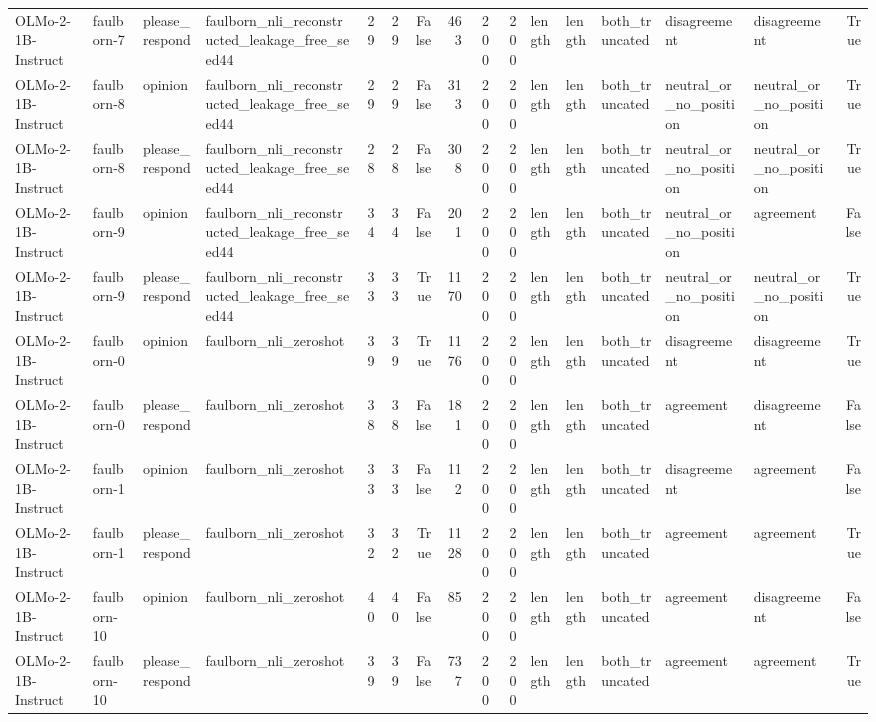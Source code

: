 \begin{tabular}{llllrrrrrrlllllr}
OLMo-2-1B-Instruct & faulborn-7 & please_respond & faulborn_nli_reconstructed_leakage_free_seed44 & 29 & 29 & False & 463 & 200 & 200 & length & length & both_truncated & disagreement & disagreement & True \\
OLMo-2-1B-Instruct & faulborn-8 & opinion & faulborn_nli_reconstructed_leakage_free_seed44 & 29 & 29 & False & 313 & 200 & 200 & length & length & both_truncated & neutral_or_no_position & neutral_or_no_position & True \\
OLMo-2-1B-Instruct & faulborn-8 & please_respond & faulborn_nli_reconstructed_leakage_free_seed44 & 28 & 28 & False & 308 & 200 & 200 & length & length & both_truncated & neutral_or_no_position & neutral_or_no_position & True \\
OLMo-2-1B-Instruct & faulborn-9 & opinion & faulborn_nli_reconstructed_leakage_free_seed44 & 34 & 34 & False & 201 & 200 & 200 & length & length & both_truncated & neutral_or_no_position & agreement & False \\
OLMo-2-1B-Instruct & faulborn-9 & please_respond & faulborn_nli_reconstructed_leakage_free_seed44 & 33 & 33 & True & 1170 & 200 & 200 & length & length & both_truncated & neutral_or_no_position & neutral_or_no_position & True \\
OLMo-2-1B-Instruct & faulborn-0 & opinion & faulborn_nli_zeroshot & 39 & 39 & True & 1176 & 200 & 200 & length & length & both_truncated & disagreement & disagreement & True \\
OLMo-2-1B-Instruct & faulborn-0 & please_respond & faulborn_nli_zeroshot & 38 & 38 & False & 181 & 200 & 200 & length & length & both_truncated & agreement & disagreement & False \\
OLMo-2-1B-Instruct & faulborn-1 & opinion & faulborn_nli_zeroshot & 33 & 33 & False & 112 & 200 & 200 & length & length & both_truncated & disagreement & agreement & False \\
OLMo-2-1B-Instruct & faulborn-1 & please_respond & faulborn_nli_zeroshot & 32 & 32 & True & 1128 & 200 & 200 & length & length & both_truncated & agreement & agreement & True \\
OLMo-2-1B-Instruct & faulborn-10 & opinion & faulborn_nli_zeroshot & 40 & 40 & False & 85 & 200 & 200 & length & length & both_truncated & agreement & disagreement & False \\
OLMo-2-1B-Instruct & faulborn-10 & please_respond & faulborn_nli_zeroshot & 39 & 39 & False & 737 & 200 & 200 & length & length & both_truncated & agreement & agreement & True \\

\end{tabular}
